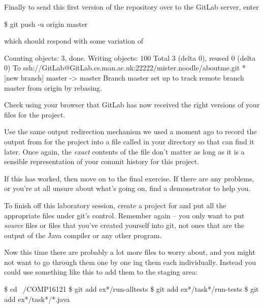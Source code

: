 Finally to send this first version of the repository over to the GitLab server, enter

\begin{ttoutenv}
\$ git push -u origin master
\end{ttoutenv}

which should respond with some variation of 

\begin{ttoutenv}
Counting objects: 3, done.
Writing objects: 100%
Total 3 (delta 0), reused 0 (delta 0)
To ssh://GitLab@GitLab.cs.man.ac.uk:22222/mister.noodle/aboutme.git
 * [new branch]      master -> master
Branch master set up to track remote branch master from origin by rebasing.
\end{ttoutenv}
 
Check using your browser that GitLab has now received the right versions of your files for the  project.

Use the same output redirection mechanism we used a moment ago to record the output from  for the  project into a file called  in your  directory so that  can find it later. Once again, the \emph{exact} contents of the file don't matter as long as it is a sensible representation of your commit history for this project.

If this has worked, then move on to the final exercise. If there are any problems, or you're at all unsure about what's going on, find a demonstrator to help you. 


To finish off this laboratory session, create a project for  and put all the appropriate files under git's control. Remember again -- you only want to put \emph{source} files or files that you've created yourself into git, not ones that are the output of the Java compiler or any other program.

Now this time there are probably a lot more files to worry about, and you might not want to go through them one by one ing them each individually. Instead you could use something like this to add them to the staging area:

\begin{ttoutenv}
\$ cd ~/COMP16121
\$ git add ex*/run-alltests
\$ git add ex*/task*/run-tests
\$ git add ex*/task*/*.java
\end{ttoutenv}

